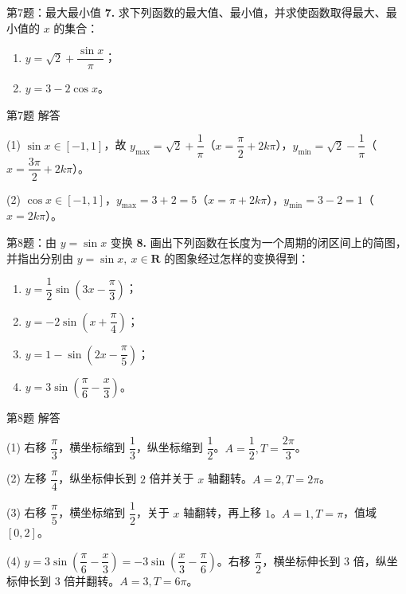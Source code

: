 \documentclass[10pt,aspectratio=169,serif]{beamer}
\begin{document}
\begin{frame}[t]{第7题：最大最小值}
\textbf{7.} 求下列函数的最大值、最小值，并求使函数取得最大、最小值的 $x$ 的集合：
\begin{enumerate}
  \item $y=\sqrt2+\dfrac{\sin x}{\pi}$；\qquad
  \item $y=3-2\cos x$。
\end{enumerate}
\end{frame}

\begin{frame}[t]{第7题 解答}
\begin{tcolorbox}[colback=orange!10,colframe=orange,title=\textbf{解}]
(1) $\sin x\in[-1,1]$，故 $y_{\max}=\sqrt2+\dfrac1\pi$（$x=\dfrac{\pi}{2}+2k\pi$），$y_{\min}=\sqrt2-\dfrac1\pi$（$x=\dfrac{3\pi}{2}+2k\pi$）。

(2) $\cos x\in[-1,1]$，$y_{\max}=3+2=5$（$x=\pi+2k\pi$），$y_{\min}=3-2=1$（$x=2k\pi$）。
\end{tcolorbox}
\end{frame}

\begin{frame}[t]{第8题：由 $y=\sin x$ 变换}
\textbf{8.} 画出下列函数在长度为一个周期的闭区间上的简图，并指出分别由 $y=\sin x,\ x\in\mathbf{R}$ 的图象经过怎样的变换得到：
\begin{enumerate}
  \item $y=\dfrac12\sin\!\left(3x-\dfrac{\pi}{3}\right)$；
  \item $y=-2\sin\!\left(x+\dfrac{\pi}{4}\right)$；
  \item $y=1-\sin\!\left(2x-\dfrac{\pi}{5}\right)$；
  \item $y=3\sin\!\left(\dfrac{\pi}{6}-\dfrac{x}{3}\right)$。
\end{enumerate}
\end{frame}

\begin{frame}[t]{第8题 解答}
\begin{tcolorbox}[colback=orange!10,colframe=orange,title=\textbf{解}]
(1) 右移 $\dfrac{\pi}{3}$，横坐标缩到 $\dfrac13$，纵坐标缩到 $\dfrac12$。$A=\dfrac12,T=\dfrac{2\pi}{3}$。

(2) 左移 $\dfrac{\pi}{4}$，纵坐标伸长到 $2$ 倍并关于 $x$ 轴翻转。$A=2,T=2\pi$。

(3) 右移 $\dfrac{\pi}{5}$，横坐标缩到 $\dfrac12$，关于 $x$ 轴翻转，再上移 $1$。$A=1,T=\pi$，值域 $[0,2]$。

(4) $y=3\sin\!\left(\dfrac{\pi}{6}-\dfrac{x}{3}\right)=-3\sin\!\left(\dfrac{x}{3}-\dfrac{\pi}{6}\right)$。右移 $\dfrac{\pi}{2}$，横坐标伸长到 $3$ 倍，纵坐标伸长到 $3$ 倍并翻转。$A=3,T=6\pi$。
\end{tcolorbox}
\end{frame}
\end{document}
